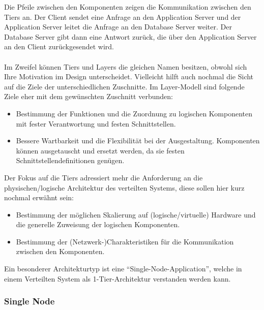 Die Pfeile zwischen den Komponenten zeigen die Kommunikation zwischen den Tiers an. Der Client sendet eine Anfrage an den Application Server und der Application Server leitet die Anfrage an den Database Server weiter. Der Database Server gibt dann eine Antwort zurück, die über den Application Server an den Client zurückgesendet wird.
\\\\
Im Zweifel können Tiers und Layers die gleichen Namen besitzen, obwohl sich Ihre Motivation im Design unterscheidet. Vielleicht hilft auch nochmal die Sicht auf die Ziele der unterschiedlichen Zuschnitte. Im Layer-Modell sind folgende Ziele eher mit dem gewünschten Zuschnitt verbunden:
\begin{itemize}
\item Bestimmung der Funktionen und die Zuordnung zu logischen Komponenten mit fester Verantwortung und festen Schnittstellen. 
\item Bessere Wartbarkeit und die Flexibilität bei der Ausgestaltung. Komponenten können ausgetauscht und ersetzt werden, da sie festen Schnittstellendefinitionen genügen.  
\end{itemize}
Der Fokus auf die Tiers adressiert mehr die Anforderung an die physischen/logische Architektur des verteilten Systems, diese sollen hier kurz nochmal erwähnt sein:
\begin{itemize}
\item Bestimmung der möglichen Skalierung auf (logische/virtuelle) Hardware und die generelle Zuweisung der logischen Komponenten.
\item Bestimmung der (Netzwerk-)Charakteristiken für die Kommunikation zwischen den Komponenten.
\end{itemize}
Ein besonderer Architekturtyp ist eine \enquote{Single-Node-Application}, welche in einem Verteilten System als 1-Tier-Architektur verstanden werden kann.

\subsubsection{Single Node}

